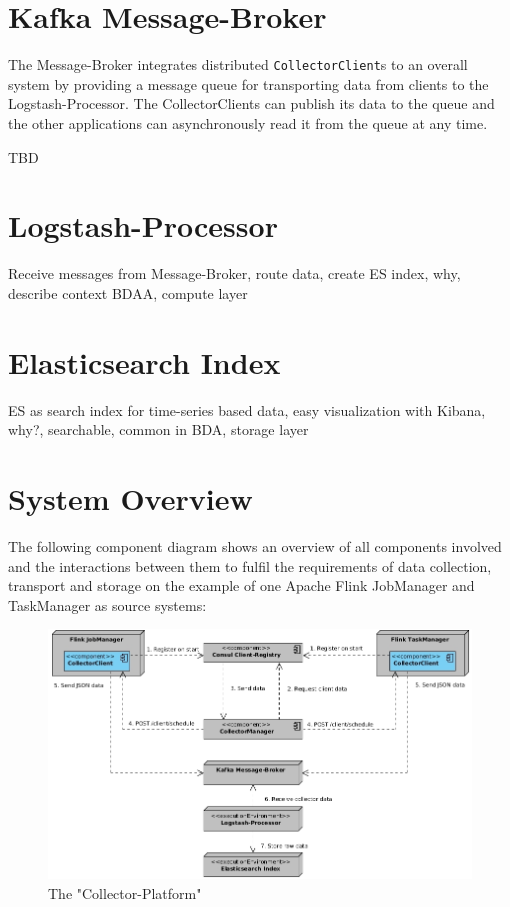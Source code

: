 \section{Kafka Message-Broker}

The Message-Broker integrates distributed \verb|CollectorClient|s to an overall system by providing a
message queue for transporting data from clients to the Logstash-Processor. The CollectorClients can publish
its data to the queue and the other applications can asynchronously read it from the queue at any time.

TBD
%
%
\section{Logstash-Processor}
%
Receive messages from Message-Broker, route data, create ES index, why, describe context BDAA, compute layer
%
\section{Elasticsearch Index}

ES as search index for time-series based data, easy visualization with Kibana, why?, searchable, common in BDA, storage layer

\section{System Overview}

The following component diagram shows an overview
of all components involved and the interactions between them to fulfil the requirements of data collection, transport and storage
on the example of one Apache Flink JobManager and TaskManager as source systems:

\begin{figure}[H]
	\centering
	\includegraphics[width=1.0\textwidth]{../uml/component-diagram.jpg}
	\caption{The "Collector-Platform"}
	\label{fig:collector-platform}
\end{figure}

